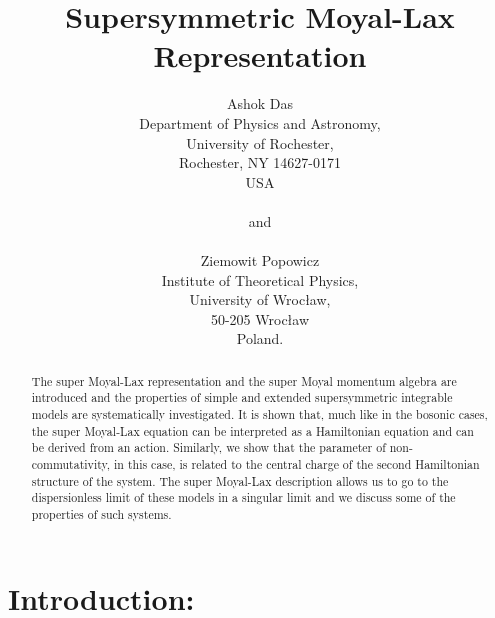 \documentclass[a4paper,11pt]{article}
\begin{document}
\title{{\bf Supersymmetric Moyal-Lax Representation}}
\author{Ashok Das\\
Department of Physics and Astronomy,\\
University of Rochester,\\
Rochester, NY 14627-0171\\
USA\\
\\
and\\
\\
Ziemowit Popowicz \\
Institute of Theoretical Physics, \\
University of Wroc\l aw,\\
50-205 Wroc\l aw\\ 
Poland.}
\date{}
\maketitle

\begin{abstract}

The super Moyal-Lax representation and the super Moyal momentum
algebra are  introduced and the properties of simple and extended
supersymmetric integrable models are  systematically investigated.
It is shown that, much like in the bosonic cases, the super Moyal-Lax
equation can be interpreted as a Hamiltonian equation and can be derived  
from an action. Similarly, we show that the parameter of non-commutativity, in
this case, is related to  the central charge 
of the second Hamiltonian structure of the system. The super Moyal-Lax
description allows us to go to the dispersionless limit of these
models in a singular limit and we discuss some of the properties of
such systems. 

 
\end{abstract}

\newpage

\section{Introduction:}
\end{document}

